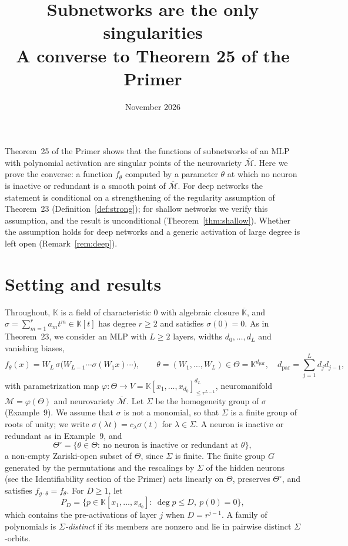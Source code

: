 \documentclass[11pt]{article}
\title{Subnetworks are the only singularities\\[4pt]\large A converse to Theorem 25 of the Primer}
\author{}
\date{November 2026}
\theoremstyle{definition}
\theoremstyle{remark}
\newcommand{\K}{\mathbb{K}}
\newcommand{\M}{\mathcal{M}}
\newcommand{\Mbar}{\overline{\M}}
\newcommand{\dpar}{d_{\mathrm{par}}}
\newcommand{\To}{\Theta^{\circ}}
\begin{document}
\maketitle

\noindent
Theorem~25 of the Primer shows that the functions of subnetworks of an MLP with polynomial activation are singular points of the neurovariety $\Mbar$. Here we prove the converse: a function $f_\theta$ computed by a parameter $\theta$ at which no neuron is inactive or redundant is a smooth point of $\Mbar$. For deep networks the statement is conditional on a strengthening of the regularity assumption of Theorem~23 (Definition~\ref{def:strong}); for shallow networks we verify this assumption, and the result is unconditional (Theorem~\ref{thm:shallow}). Whether the assumption holds for deep networks and a generic activation of large degree is left open (Remark~\ref{rem:deep}).

\section{Setting and results}

Throughout, $\K$ is a field of characteristic $0$ with algebraic closure $\overline{\K}$, and $\sigma=\sum_{m=1}^r a_mt^m\in\K[t]$ has degree $r\ge2$ and satisfies $\sigma(0)=0$. As in Theorem~23, we consider an MLP with $L\ge2$ layers, widths $d_0,\dots,d_L$ and vanishing biases,
\[
f_\theta(x)=W_L\,\sigma\big(W_{L-1}\cdots\sigma(W_1x)\cdots\big),\qquad \theta=(W_1,\dots,W_L)\in\Theta=\K^{\dpar},\quad \dpar=\textstyle\sum_{j=1}^Ld_jd_{j-1},
\]
with parametrization map $\varphi\colon\Theta\to V=\K[x_1,\dots,x_{d_0}]_{\le r^{L-1}}^{d_L}$, neuromanifold $\M=\varphi(\Theta)$ and neurovariety $\Mbar$. Let $\Sigma$ be the homogeneity group of $\sigma$ (Example~9). We assume that $\sigma$ is not a monomial, so that $\Sigma$ is a finite group of roots of unity; we write $\sigma(\lambda t)=c_\lambda\sigma(t)$ for $\lambda\in\Sigma$. A neuron is inactive or redundant as in Example~9, and
\[
\To=\{\theta\in\Theta:\ \text{no neuron is inactive or redundant at }\theta\},
\]
a non-empty Zariski-open subset of $\Theta$, since $\Sigma$ is finite. The finite group $G$ generated by the permutations and the rescalings by $\Sigma$ of the hidden neurons (see the Identifiability section of the Primer) acts linearly on $\Theta$, preserves $\To$, and satisfies $f_{g\cdot\theta}=f_\theta$. For $D\ge1$, let
\[
P_D=\{p\in\K[x_1,\dots,x_{d_0}]:\ \deg p\le D,\ p(0)=0\},
\]
which contains the pre-activations of layer $j$ when $D=r^{j-1}$. A family of polynomials is \emph{$\Sigma$-distinct} if its members are nonzero and lie in pairwise distinct $\Sigma$-orbits.
\end{document}
